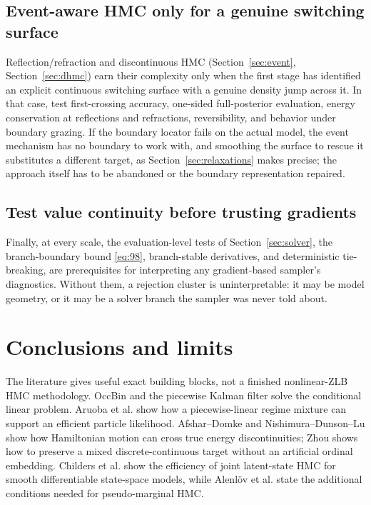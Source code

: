 \documentclass[11pt]{article}
\begin{document}
\subsection*{Event-aware HMC only for a genuine switching surface}

Reflection/refraction and discontinuous HMC (Section~\ref{sec:event}, Section~\ref{sec:dhmc})
earn their complexity only when the first stage has identified an explicit
continuous switching surface with a genuine density jump across it. In that
case, test first-crossing accuracy, one-sided full-posterior evaluation,
energy conservation at reflections and refractions, reversibility, and
behavior under boundary grazing. If the boundary locator fails on the actual
model, the event mechanism has no boundary to work with, and smoothing the
surface to rescue it substitutes a different target, as
Section~\ref{sec:relaxations} makes precise; the approach itself has to be
abandoned or the boundary representation repaired.

\subsection*{Test value continuity before trusting gradients}

Finally, at every scale, the evaluation-level tests of Section~\ref{sec:solver},
the branch-boundary bound \eqref{eq:98}, branch-stable derivatives, and
deterministic tie-breaking, are prerequisites for interpreting any
gradient-based sampler's diagnostics. Without them, a rejection cluster is
uninterpretable: it may be model geometry, or it may be a solver branch the
sampler was never told about.

\section{Conclusions and limits}
\label{sec:conclusion}

The literature gives useful exact building blocks, not a finished
nonlinear-ZLB HMC methodology. OccBin and the piecewise Kalman filter solve
the conditional linear problem. Aruoba et al. show how a piecewise-linear
regime mixture can support an efficient particle likelihood. Afshar--Domke and
Nishimura--Dunson--Lu show how Hamiltonian motion can cross true energy
discontinuities; Zhou shows how to preserve a mixed discrete-continuous target
without an artificial ordinal embedding. Childers et al. show the efficiency
of joint latent-state HMC for smooth differentiable state-space models, while
Alenl\"ov et al. state the additional conditions needed for pseudo-marginal
HMC.
\end{document}
